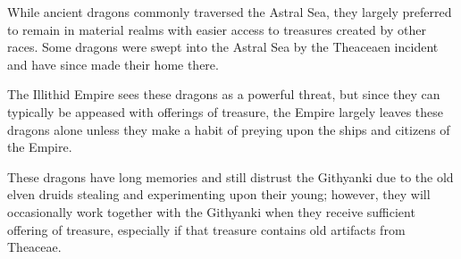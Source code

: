 While ancient dragons commonly traversed the Astral Sea, they largely preferred to remain in material realms with easier access to treasures created by other races.
Some dragons were swept into the Astral Sea by the Theaceaen incident and have since made their home there.

The Illithid Empire sees these dragons as a powerful threat, but since they can typically be appeased with offerings of treasure, the Empire largely leaves these dragons alone unless they make a habit of preying upon the ships and citizens of the Empire.

These dragons have long memories and still distrust the Githyanki due to the old elven druids stealing and experimenting upon their young; however, they will occasionally work together with the Githyanki when they receive sufficient offering of treasure, especially if that treasure contains old artifacts from Theaceae.
